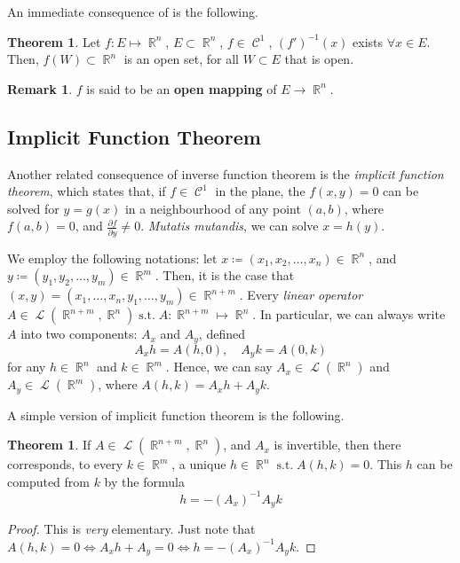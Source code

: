\documentclass{amsart} %
\theoremstyle{mytheoremstyle}
\theoremstyle{definition}
\newtheorem{theorem}[definition]{Theorem}
\newtheorem{remark}[definition]{Remark}
\numberwithin{equation}{section}
\DeclareMathOperator{\R}{\mathbb{R}}
\DeclareMathOperator{\1}{\mathbbm{1}}
\DeclareMathOperator{\suchthat}{\text{ s.t. }}
\DeclareMathOperator{\contf}{\mathcal{C}}
\DeclareMathOperator{\linearop}{\mathcal{L}}
\begin{document}
An immediate consequence of  is the following.

\begin{theorem}
	Let $f : E \mapsto \R^n$, $E \subset \R^n$, $f \in \contf^1$, $(f')^{-1} (x)$ exists $\forall x \in E$. Then, $f(W) \subset \R^n$ is an open set, for all $W \subset E$ that is open. 
\end{theorem}

\begin{remark}
	$f$ is said to be an \textbf{open mapping} of $E \to \R^n$.
\end{remark}


\subsection{Implicit Function Theorem}

Another related consequence of inverse function theorem is the \textit{implicit function theorem}, which states that, if $f \in \contf^1$ in the plane, the $f(x,y) = 0$ can be solved for $y=g(x)$ in a neighbourhood of any point $(a,b)$, where $f(a,b) = 0$, and $\frac{\partial f}{\partial y} \neq 0$. \textit{Mutatis mutandis}, we can solve $x = h(y)$.

We employ the following notations: let $x \coloneqq (x_1,x_2,\dots,x_n) \in \R^n$, and $y \coloneqq (y_1,y_2,\dots,y_m) \in \R^m$. Then, it is the case that $(x,y) = (x_1,\dots,x_n,y_1,\dots,y_m) \in \R^{n+m}$. Every \textit{linear operator} $A \in \linearop (\R^{n+m},\R^n) \suchthat A: \R^{n+m} \mapsto \R^n$. In particular, we can always write $A$ into two components: $A_x$ and $A_y$, defined
$$ A_x h =A(h,0), \quad A_y k = A(0,k) $$
for any $h \in \R^n$ and $k \in \R^m$. Hence, we can say $A_x \in \linearop (\R^n)$ and $A_y \in \linearop (\R^m)$, where $A(h,k)=A_x h+ A_y k$.

A simple version of implicit function theorem is the following.

\begin{theorem}
	\label{thmimplicitfunctionlinear}
	If $A \in \linearop (\R^{n+m},\R^n)$, and $A_x$ is invertible, then there corresponds, to every $k \in \R^m$, a unique $h \in \R^n \suchthat A(h,k) =0$. This $h$ can be computed from $k$ by the formula
	$$ h = -(A_x)^{-1} A_y k $$
\end{theorem}

\begin{proof}
	This is \textit{very} elementary. Just note that $A(h,k)=0 \iff A_x h + A_y = 0 \iff h = -(A_x)^{-1} A_y k $.
\end{proof}
\end{document}
